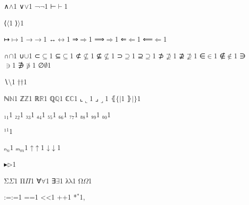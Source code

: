 {{∧}{{\ensuremath{\wedge}}}1
{∨}{{\ensuremath{\vee}}}1
{¬}{{\ensuremath{\neg}}}1
{⊢}{{\ensuremath{\vdash}}}1

{⟨}{{\ensuremath{\langle}}}1
{⟩}{{\ensuremath{\rangle}}}1

{↦}{{\ensuremath{\mapsto}}}1
{→}{{\ensuremath{\rightarrow}}}1
{↔}{{\ensuremath{\leftrightarrow}}}1
{⇒}{{\ensuremath{\Rightarrow}}}1
{⟹}{{\ensuremath{\Longrightarrow}}}1
{⇐}{{\ensuremath{\Leftarrow}}}1
{⟸}{{\ensuremath{\Longleftarrow}}}1

{∩}{{\ensuremath{\cap}}}1
{∪}{{\ensuremath{\cup}}}1
{⊂}{{\ensuremath{\subseteq}}}1
{⊆}{{\ensuremath{\subseteq}}}1
{⊄}{{\ensuremath{\nsubseteq}}}1
{⊈}{{\ensuremath{\nsubseteq}}}1
{⊃}{{\ensuremath{\supseteq}}}1
{⊇}{{\ensuremath{\supseteq}}}1
{⊅}{{\ensuremath{\nsupseteq}}}1
{⊉}{{\ensuremath{\nsupseteq}}}1
{∈}{{\ensuremath{\in}}}1
{∉}{{\ensuremath{\notin}}}1
{∋}{{\ensuremath{\ni}}}1
{∌}{{\ensuremath{\notni}}}1
{∅}{{\ensuremath{\emptyset}}}1

{∖}{{\ensuremath{\setminus}}}1
{†}{{\ensuremath{\dag}}}1

{ℕ}{{\ensuremath{\mathbb{N}}}}1
{ℤ}{{\ensuremath{\mathbb{Z}}}}1
{ℝ}{{\ensuremath{\mathbb{R}}}}1
{ℚ}{{\ensuremath{\mathbb{Q}}}}1
{ℂ}{{\ensuremath{\mathbb{C}}}}1
{⌞}{{\ensuremath{\llcorner}}}1
{⌟}{{\ensuremath{\lrcorner}}}1
{⦃}{{\ensuremath{\{\!|}}}1
{⦄}{{\ensuremath{|\!\}}}}1

{₁}{{\ensuremath{_1}}}1
{₂}{{\ensuremath{_2}}}1
{₃}{{\ensuremath{_3}}}1
{₄}{{\ensuremath{_4}}}1
{₅}{{\ensuremath{_5}}}1
{₆}{{\ensuremath{_6}}}1
{₇}{{\ensuremath{_7}}}1
{₈}{{\ensuremath{_8}}}1
{₉}{{\ensuremath{_9}}}1
{₀}{{\ensuremath{_0}}}1

{¹}{{\ensuremath{^1}}}1

{ₙ}{{\ensuremath{_n}}}1
{ₘ}{{\ensuremath{_m}}}1
{↑}{{\ensuremath{\uparrow}}}1
{↓}{{\ensuremath{\downarrow}}}1

{▸}{{\ensuremath{\triangleright}}}1

{Σ}{{\color{symbolcolor}\ensuremath{\Sigma}}}1
{Π}{{\color{symbolcolor}\ensuremath{\Pi}}}1
{∀}{{\color{symbolcolor}\ensuremath{\forall}}}1
{∃}{{\color{symbolcolor}\ensuremath{\exists}}}1
{λ}{{\color{symbolcolor}\ensuremath{\mathrm{\lambda}}}}1
{Ω}{{\color{symbolcolor}\ensuremath{\Omega}}}1

{:=}{{\color{symbolcolor}:=}}1
{=}{{\color{symbolcolor}=}}1
{<}{{\color{symbolcolor}<}}1
{+}{{\color{symbolcolor}+}}1
{*}{{\color{symbolcolor}\ensuremath{{}^{*}}}}1,

}
